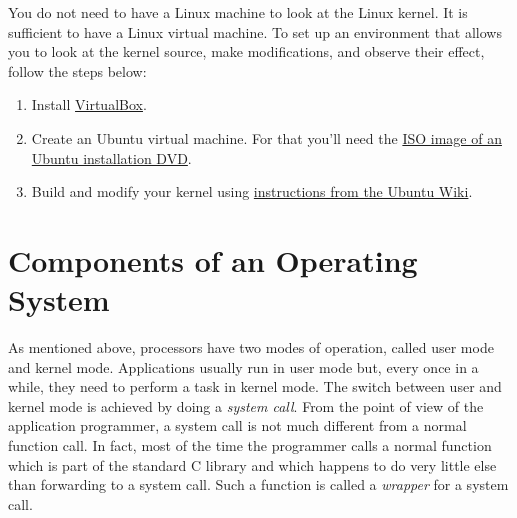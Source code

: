 You do not need to have a Linux machine to look at the Linux kernel.
It is sufficient to have a Linux virtual machine.
To set up an environment that allows you
  to look at the kernel source, make modifications, and observe their effect,
  follow the steps below:
\begin{enumerate}
\item Install \href{https://www.virtualbox.org/wiki/Downloads}{VirtualBox}.
\item Create an Ubuntu virtual machine.
  For that you'll need the
    \href{https://www.ubuntu.com/download/desktop}%
      {ISO image of an Ubuntu installation DVD}.
\item Build and modify your kernel using
  \href{https://wiki.ubuntu.com/Kernel/BuildYourOwnKernel}%
    {instructions from the Ubuntu Wiki}.
\end{enumerate}

\section{Components of an Operating System}

As mentioned above,
  processors have two modes of operation,
  called user mode and kernel mode.
Applications usually run in user mode
  but, every once in a while,
   they need to perform a task in kernel mode.
The switch between user and kernel mode
  is achieved by doing a \emph{system call}.
From the point of view of the application programmer,
  a system call is not much different from a normal function call.
In fact,
  most of the time the programmer calls a normal function
  which is part of the standard C library
  and which happens to do very little else than forwarding to a system call.
Such a function is called a \emph{wrapper} for a system call.

